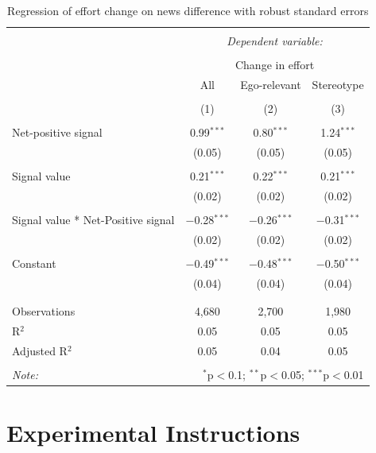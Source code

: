 \documentclass[
  12pt,
]{article}
\begin{document}
\begin{table}[!htbp] \centering 
  \caption{Regression of effort change on news difference with robust standard errors} 
  \label{tab:regression-net} 
\begin{tabular}{@{\extracolsep{5pt}}lccc} 
\\[-1.8ex]\hline 
\hline \\[-1.8ex] 
 & \multicolumn{3}{c}{\textit{Dependent variable:}} \\ 
\cline{2-4} 
\\[-1.8ex] & \multicolumn{3}{c}{Change in effort} \\ 
 & All & Ego-relevant & Stereotype \\ 
\\[-1.8ex] & (1) & (2) & (3)\\ 
\hline \\[-1.8ex] 
 Net-positive signal & 0.99$^{***}$ & 0.80$^{***}$ & 1.24$^{***}$ \\ 
  & (0.05) & (0.05) & (0.05) \\ 
  & & & \\ 
 Signal value & 0.21$^{***}$ & 0.22$^{***}$ & 0.21$^{***}$ \\ 
  & (0.02) & (0.02) & (0.02) \\ 
  & & & \\ 
 Signal value * Net-Positive signal & $-$0.28$^{***}$ & $-$0.26$^{***}$ & $-$0.31$^{***}$ \\ 
  & (0.02) & (0.02) & (0.02) \\ 
  & & & \\ 
 Constant & $-$0.49$^{***}$ & $-$0.48$^{***}$ & $-$0.50$^{***}$ \\ 
  & (0.04) & (0.04) & (0.04) \\ 
  & & & \\ 
\hline \\[-1.8ex] 
Observations & 4,680 & 2,700 & 1,980 \\ 
R$^{2}$ & 0.05 & 0.05 & 0.05 \\ 
Adjusted R$^{2}$ & 0.05 & 0.04 & 0.05 \\ 
\hline 
\hline \\[-1.8ex] 
\textit{Note:}  & \multicolumn{3}{r}{$^{*}$p$<$0.1; $^{**}$p$<$0.05; $^{***}$p$<$0.01} \\ 
\end{tabular} 
\end{table}

\hypertarget{experimental-instructions}{%
\section{Experimental Instructions}\label{experimental-instructions}}
\end{document}
